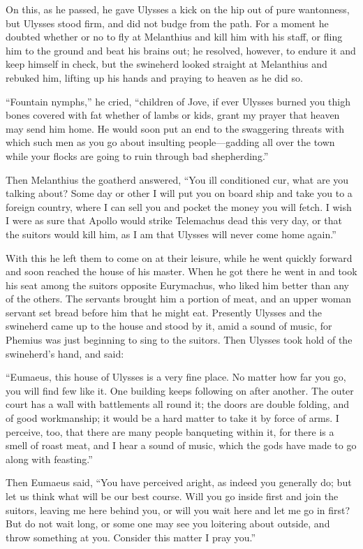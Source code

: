 On this, as he passed, he gave Ulysses a kick on the hip out of pure
wantonness, but Ulysses stood firm, and did not budge from the path. For a
moment he doubted whether or no to fly at Melanthius and kill him with his
staff, or fling him to the ground and beat his brains out; he resolved,
however, to endure it and keep himself in check, but the swineherd looked
straight at Melanthius and rebuked him, lifting up his hands and praying to
heaven as he did so.

“Fountain nymphs,” he cried, “children of Jove, if ever Ulysses burned you
thigh bones covered with fat whether of lambs or kids, grant my prayer that
heaven may send him home. He would soon put an end to the swaggering threats
with which such men as you go about insulting people—gadding all over the town
while your flocks are going to ruin through bad shepherding.”

Then Melanthius the goatherd answered, “You ill conditioned cur, what are you
talking about? Some day or other I will put you on board ship and take you to a
foreign country, where I can sell you and pocket the money you will fetch. I
wish I were as sure that Apollo would strike Telemachus dead this very day, or
that the suitors would kill him, as I am that Ulysses will never come home
again.”

With this he left them to come on at their leisure, while he went quickly
forward and soon reached the house of his master. When he got there he went in
and took his seat among the suitors opposite Eurymachus, who liked him better
than any of the others. The servants brought him a portion of meat, and an
upper woman servant set bread before him that he might eat. Presently Ulysses
and the swineherd came up to the house and stood by it, amid a sound of music,
for Phemius was just beginning to sing to the suitors. Then Ulysses took hold
of the swineherd’s hand, and said:

“Eumaeus, this house of Ulysses is a very fine place. No matter how far you go,
you will find few like it. One building keeps following on after another. The
outer court has a wall with battlements all round it; the doors are double
folding, and of good workmanship; it would be a hard matter to take it by force
of arms. I perceive, too, that there are many people banqueting within it, for
there is a smell of roast meat, and I hear a sound of music, which the gods
have made to go along with feasting.”

Then Eumaeus said, “You have perceived aright, as indeed you generally do; but
let us think what will be our best course. Will you go inside first and join
the suitors, leaving me here behind you, or will you wait here and let me go in
first? But do not wait long, or some one may see you loitering about outside,
and throw something at you. Consider this matter I pray you.”

